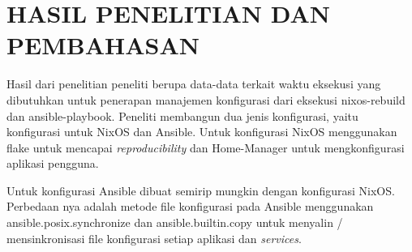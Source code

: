 \documentclass[10pt,twoside]{report}
\begin{document}
\chapter{HASIL PENELITIAN DAN PEMBAHASAN}
Hasil dari penelitian peneliti berupa data-data terkait waktu eksekusi yang
dibutuhkan untuk penerapan manajemen konfigurasi dari eksekusi nixos-rebuild
dan ansible-playbook. Peneliti membangun dua jenis konfigurasi, yaitu
konfigurasi untuk NixOS dan Ansible. Untuk konfigurasi NixOS menggunakan flake
untuk mencapai \textit{reproducibility} dan Home-Manager untuk mengkonfigurasi
aplikasi pengguna.

Untuk konfigurasi Ansible dibuat semirip mungkin dengan konfigurasi NixOS.
Perbedaan nya adalah metode file konfigurasi pada Ansible menggunakan
ansible.posix.synchronize dan ansible.builtin.copy untuk menyalin /
mensinkronisasi file konfigurasi setiap aplikasi dan \textit{services}.
\vspace{3mm}
\end{document}
